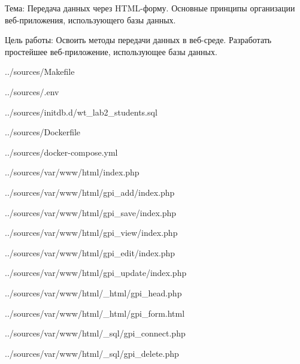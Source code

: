 Тема:
Передача данных через HTML-форму.
Основные принципы организации веб-приложения, использующего базы данных.

Цель работы:
Освоить методы передачи данных в веб-среде.
Разработать простейшее веб-приложение, использующее базы данных.


{../sources/Makefile}


{../sources/.env}


{../sources/initdb.d/wt_lab2_students.sql}


{../sources/Dockerfile}

\newpage


{../sources/docker-compose.yml}


{../sources/var/www/html/index.php}

\newpage


{../sources/var/www/html/gpi_add/index.php}


{../sources/var/www/html/gpi_save/index.php}

\newpage


{../sources/var/www/html/gpi_view/index.php}

\newpage


{../sources/var/www/html/gpi_edit/index.php}


{../sources/var/www/html/gpi_update/index.php}


{../sources/var/www/html/_html/gpi_head.php}


{../sources/var/www/html/_html/gpi_form.html}


{../sources/var/www/html/_sql/gpi_connect.php}


{../sources/var/www/html/_sql/gpi_delete.php}
